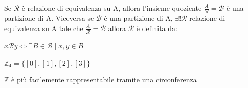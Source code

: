 \begin{boxA}
    Se $\mathcal{R}$ è relazione di equivalenza su A, allora l'insieme quoziente $\frac{A}{\mathcal{R}} = \mathcal{B}$ è una partizione di A. 
    Viceversa se $\mathcal{B}$ è una partizione di A, $\exists ! \mathcal{R}$ relazione di equivalenza su A tale che $\frac{A}{\mathcal{R}} = \mathcal{B}$ allora $\mathcal{R}$ è definita da:
    \begin{center}
        $x\mathcal{R}y \Leftrightarrow \exists B \in \mathcal{B} \; | \; x, y \in B$
    \end{center}
\end{boxA}

\begin{boxA}
    \begin{minipage}[t]{0.5\textwidth}
        \centering
        $\mathbb{Z}_4 = \{[0], [1], [2], [3]\}$ \\
    \hfill
    \end{minipage}
    \begin{minipage}[t]{0.5\textwidth}
        \centering
    $\mathbb{Z}$ è più facilemente rappresentabile tramite una circonferenza
    \end{minipage}
\end{boxA}